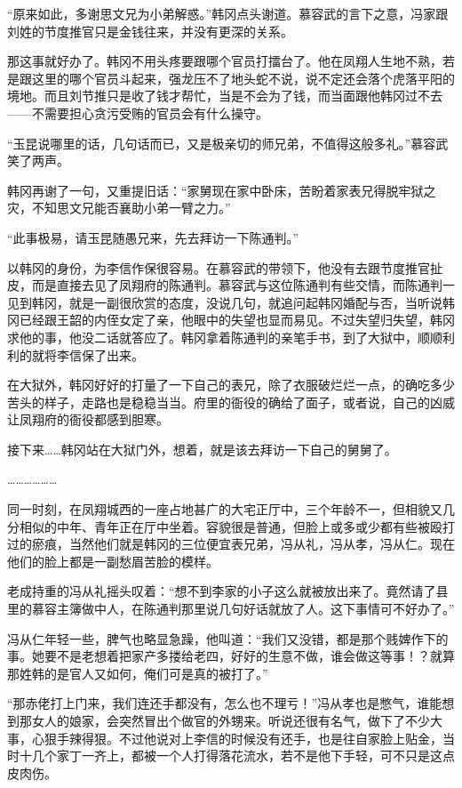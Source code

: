 “原来如此，多谢思文兄为小弟解惑。”韩冈点头谢道。慕容武的言下之意，冯家跟刘姓的节度推官只是金钱往来，并没有更深的关系。

那这事就好办了。韩冈不用头疼要跟哪个官员打擂台了。他在凤翔人生地不熟，若是跟这里的哪个官员斗起来，强龙压不了地头蛇不说，说不定还会落个虎落平阳的境地。而且刘节推只是收了钱才帮忙，当是不会为了钱，而当面跟他韩冈过不去——不需要担心贪污受贿的官员会有什么操守。

“玉昆说哪里的话，几句话而已，又是极亲切的师兄弟，不值得这般多礼。”慕容武笑了两声。

韩冈再谢了一句，又重提旧话：“家舅现在家中卧床，苦盼着家表兄得脱牢狱之灾，不知思文兄能否襄助小弟一臂之力。”

“此事极易，请玉昆随愚兄来，先去拜访一下陈通判。”

以韩冈的身份，为李信作保很容易。在慕容武的带领下，他没有去跟节度推官扯皮，而是直接去见了凤翔府的陈通判。慕容武与这位陈通判有些交情，而陈通判一见到韩冈，就是一副很欣赏的态度，没说几句，就追问起韩冈婚配与否，当听说韩冈已经跟王韶的内侄女定了亲，他眼中的失望也显而易见。不过失望归失望，韩冈求他的事，他没二话就答应了。韩冈拿着陈通判的亲笔手书，到了大狱中，顺顺利利的就将李信保了出来。

在大狱外，韩冈好好的打量了一下自己的表兄，除了衣服破烂烂一点，的确吃多少苦头的样子，走路也是稳稳当当。府里的衙役的确给了面子，或者说，自己的凶威让凤翔府的衙役都感到胆寒。

接下来……韩冈站在大狱门外，想着，就是该去拜访一下自己的舅舅了。

………………

同一时刻，在凤翔城西的一座占地甚广的大宅正厅中，三个年龄不一，但相貌又几分相似的中年、青年正在厅中坐着。容貌很是普通，但脸上或多或少都有些被殴打过的瘀痕，当然他们就是韩冈的三位便宜表兄弟，冯从礼，冯从孝，冯从仁。现在他们的脸上都是一副愁眉苦脸的模样。

老成持重的冯从礼摇头叹着：“想不到李家的小子这么就被放出来了。竟然请了县里的慕容主簿做中人，在陈通判那里说几句好话就放了人。这下事情可不好办了。”

冯从仁年轻一些，脾气也略显急躁，他叫道：“我们又没错，都是那个贱婢作下的事。她要不是老想着把家产多搂给老四，好好的生意不做，谁会做这等事！？就算那姓韩的是官人又如何，俺们可是真的被打了。”

“那赤佬打上门来，我们连还手都没有，怎么也不理亏！”冯从孝也是憋气，谁能想到那女人的娘家，会突然冒出个做官的外甥来。听说还很有名气，做下了不少大事，心狠手辣得狠。不过他说对上李信的时候没有还手，也是往自家脸上贴金，当时十几个家丁一齐上，都被一个人打得落花流水，若不是他下手轻，可不只是这点皮肉伤。

